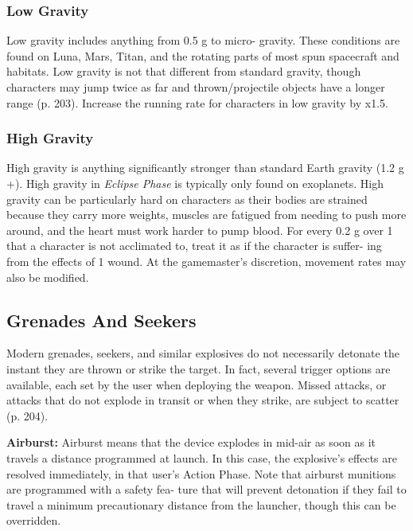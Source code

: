 \subsubsection{Low Gravity}

Low gravity includes anything from 0.5 g to micro-
gravity. These conditions are found on Luna, Mars, 
Titan, and the rotating parts of most spun spacecraft 
and habitats. Low gravity is not that different from 
standard gravity, though characters may jump twice as 
far and thrown/projectile objects have a longer range 
(p. 203). Increase the running rate for characters in 
low gravity by x1.5.

\subsubsection{High Gravity}

High gravity is anything significantly stronger than 
standard Earth gravity (1.2 g +). High gravity in 
\textit{Eclipse Phase} is typically only found on exoplanets. 
High gravity can be particularly hard on characters 
as their bodies are strained because they carry more 
weights, muscles are fatigued from needing to push 
more around, and the heart must work harder to 
pump blood. For every 0.2 g over 1 that a character is 
not acclimated to, treat it as if the character is suffer-
ing from the effects of 1 wound. At the gamemaster's 
discretion, movement rates may also be modified.

\subsection{Grenades And Seekers}

Modern grenades, seekers, and similar explosives do 
not necessarily detonate the instant they are thrown 
or strike the target. In fact, several trigger options 
are available, each set by the user when deploying 
the weapon. Missed attacks, or attacks that do not 
explode in transit or when they strike, are subject to 
scatter (p. 204).

\textbf{Airburst:} Airburst means that the device explodes in 
mid-air as soon as it travels a distance programmed at 
launch. In this case, the explosive's effects are resolved 
immediately, in that user's Action Phase. Note that 
airburst munitions are programmed with a safety fea-
ture that will prevent detonation if they fail to travel 
a minimum precautionary distance from the launcher, 
though this can be overridden.

